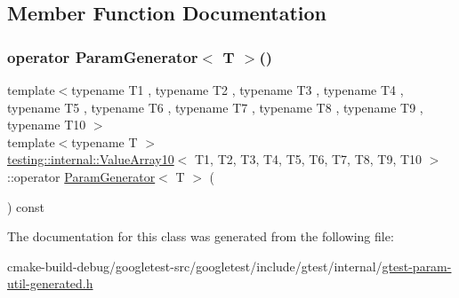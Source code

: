 \subsection{Member Function Documentation}
\mbox{\label{classtesting_1_1internal_1_1ValueArray10_afa8855c713997ae82781159f3a3d53fc}} 
\subsubsection{\texorpdfstring{operator ParamGenerator$<$ T $>$()}{operator ParamGenerator< T >()}}
{\footnotesize\ttfamily template$<$typename T1 , typename T2 , typename T3 , typename T4 , typename T5 , typename T6 , typename T7 , typename T8 , typename T9 , typename T10 $>$ \\
template$<$typename T $>$ \\
\mbox{\hyperlink{classtesting_1_1internal_1_1ValueArray10}{testing\+::internal\+::\+Value\+Array10}}$<$ T1, T2, T3, T4, T5, T6, T7, T8, T9, T10 $>$\+::operator \mbox{\hyperlink{classtesting_1_1internal_1_1ParamGenerator}{Param\+Generator}}$<$ T $>$ (\begin{DoxyParamCaption}{ }\end{DoxyParamCaption}) const\hspace{0.3cm}{\ttfamily [inline]}}



The documentation for this class was generated from the following file\+:\begin{DoxyCompactItemize}
\item 
cmake-\/build-\/debug/googletest-\/src/googletest/include/gtest/internal/\mbox{\hyperlink{gtest-param-util-generated_8h}{gtest-\/param-\/util-\/generated.\+h}}\end{DoxyCompactItemize}
